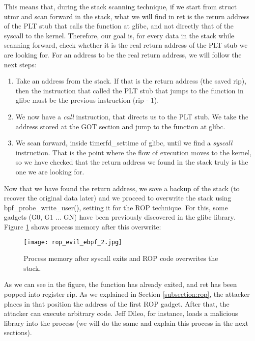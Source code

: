 This means that, during the stack scanning technique, if we start from struct utmr and scan forward in the stack, what we will find in ret is the return address of the PLT stub that calls the function at glibc, and not directly that of the syscall to the kernel. Therefore, our goal is, for every data in the stack while scanning forward, check whether it is the real return address of the PLT stub we are looking for. For an address to be the real return address, we will follow the next steps:
\begin{enumerate}
\item Take an address from the stack. If that is the return address (the saved rip), then the instruction that called the PLT stub that jumps to the function in glibc must be the previous instruction (rip - 1).
\item We now have a \textit{call} instruction, that directs us to the PLT stub. We take the address stored at the GOT section and jump to the function at glibc.
\item We scan forward, inside timerfd\_settime of glibc, until we find a \textit{syscall} instruction. That is the point where the flow of execution moves to the kernel, so we have checked that the return address we found in the stack truly is the one we are looking for.
\end{enumerate}

Now that we have found the return address, we save a backup of the stack (to recover the original data later) and we proceed to overwrite the stack using bpf\_probe\_write\_user(), setting it for the ROP technique. For this, some gadgets (G0, G1 ... GN) have been previously discovered in the glibc library. Figure \ref{fig:rop_evil_ebpf_2} shows process memory after this overwrite:

\begin{figure}[H]
	\centering
	\texttt{[image: rop\_evil\_ebpf\_2.jpg]}
	\caption{Process memory after syscall exits and ROP code overwrites the stack.}
	\label{fig:rop_evil_ebpf_2}
\end{figure}

As we can see in the figure, the function has already exited, and ret has been popped into register rip. As we explained in Section \ref{subsection:rop}, the attacker places in that position the address of the first ROP gadget. After that, the attacker can execute arbitrary code. Jeff Dileo, for instance, loads a malicious library into the process (we will do the same and explain this process in the next sections).

